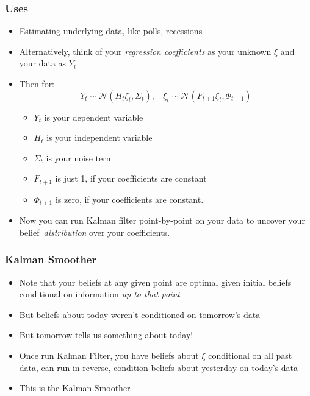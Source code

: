 \documentclass{beamer}
\begin{document}
\begin{frame}
\frametitle[alignment=center]{Uses}
\begin{itemize}
\item Estimating underlying data, like polls, recessions
\bigskip
\item Alternatively, think of your \emph{regression coefficients} as your unknown $\xi$ and your data as $Y_t$
\bigskip
\item Then for:
$$Y_t\sim\mathcal{N}\left(H_t\xi_t,\Sigma_t\right),\ \ \ \ \xi_{t}\sim\mathcal{N}\left(F_{t+1}\xi_t,\Phi_{t+1}\right)$$
\begin{itemize}
\item $Y_t$ is your dependent variable
\item $H_t$ is your independent variable
\item $\Sigma_t$ is your noise term
\item $F_{t+1}$ is just 1, if your coefficients are constant
\item $\Phi_{t+1}$ is zero, if your coefficients are constant.
\end{itemize}
\item Now you can run Kalman filter point-by-point on your data to uncover your belief\ \emph{distribution} over your coefficients.
\end{itemize}
\end{frame}

\begin{frame}
\frametitle[alignment=center]{Kalman Smoother}
\begin{itemize}
\item Note that your beliefs at any given point are optimal given initial beliefs conditional on information \emph{up to that point}
\bigskip
\item But beliefs about today weren't conditioned on tomorrow's data
\bigskip
\item But tomorrow tells us something about today!
\bigskip
\item Once run Kalman Filter, you have beliefs about $\xi$ conditional on all past data, can run in reverse, condition beliefs about yesterday on today's data
\bigskip
\item This is the Kalman Smoother
\end{itemize}
\end{frame}
\end{document}

